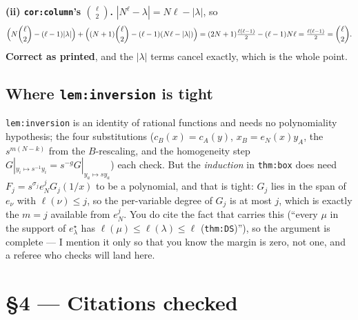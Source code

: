 \documentclass[11pt]{article}
\begin{document}
\textbf{(ii) \texttt{cor:column}'s $\binom\ell2$.} $|N^\ell-\lambda|=N\ell-|\lambda|$, so
\[ \Bigl(N\binom\ell2-(\ell-1)|\lambda|\Bigr)+\Bigl((N+1)\binom\ell2-(\ell-1)(N\ell-|\lambda|)\Bigr)
 =(2N+1)\tfrac{\ell(\ell-1)}2-(\ell-1)N\ell=\tfrac{\ell(\ell-1)}2=\binom\ell2 . \]
\textbf{Correct as printed}, and the $|\lambda|$ terms cancel exactly, which is the whole point.

\subsection{Where \texttt{lem:inversion} is tight}

\texttt{lem:inversion} is an identity of rational functions and needs no polynomiality hypothesis;
the four substitutions ($c_B(x)=c_A(y)$, $x_B=e_N(x)y_A$, the $s^{m(N-k)}$ from the $B$-rescaling,
and the homogeneity step $G|_{y_i\mapsto s^{-1}y_i}=s^{-g}G|_{y_a\mapsto sy_a}$) each check. But the
\emph{induction} in \texttt{thm:box} does need $F_j=s^{\sigma_j}e_N^jG_j(1/x)$ to be a polynomial, and
that is tight: $G_j$ lies in the span of $e_\nu$ with $\ell(\nu)\le j$, so the per-variable degree of
$G_j$ is at most $j$, which is exactly the $m=j$ available from $e_N^j$. You do cite the fact that
carries this (``every $\mu$ in the support of $e^\star_\lambda$ has $\ell(\mu)\le\ell(\lambda)\le\ell$
(\texttt{thm:DS})''), so the argument is complete --- I mention it only so that you know the margin is
zero, not one, and a referee who checks will land here.

\section{\S4 --- Citations checked}
\end{document}
